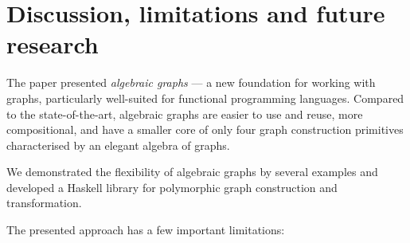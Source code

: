 \section{Discussion, limitations and future research}\label{sec-discussion}

The paper presented \emph{algebraic graphs} --- a new foundation for working
with graphs, particularly well-suited for functional programming languages.
Compared to the state-of-the-art, algebraic graphs are easier to use and reuse,
more compositional, and have a smaller core of only four graph
construction primitives characterised by an elegant algebra of graphs.

We demonstrated the flexibility of algebraic graphs by several examples and
developed a Haskell library for polymorphic graph construction and transformation.

The presented approach has a few important limitations:

